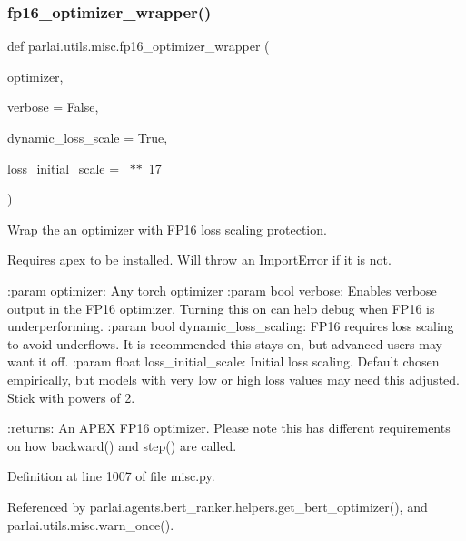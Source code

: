 \subsubsection{\texorpdfstring{fp16\+\_\+optimizer\+\_\+wrapper()}{fp16\_optimizer\_wrapper()}}
{\footnotesize\ttfamily def parlai.\+utils.\+misc.\+fp16\+\_\+optimizer\+\_\+wrapper (\begin{DoxyParamCaption}\item[{}]{optimizer,  }\item[{}]{verbose = {\ttfamily False},  }\item[{}]{dynamic\+\_\+loss\+\_\+scale = {\ttfamily True},  }\item[{}]{loss\+\_\+initial\+\_\+scale = {~$\ast$$\ast$~17} }\end{DoxyParamCaption})}

\begin{DoxyVerb}Wrap the an optimizer with FP16 loss scaling protection.

Requires apex to be installed. Will throw an ImportError if it is not.

:param optimizer:
    Any torch optimizer
:param bool verbose:
    Enables verbose output in the FP16 optimizer. Turning this on can help
    debug when FP16 is underperforming.
:param bool dynamic_loss_scaling:
    FP16 requires loss scaling to avoid underflows. It is recommended this
    stays on, but advanced users may want it off.
:param float loss_initial_scale:
    Initial loss scaling. Default chosen empirically, but models with very low
    or high loss values may need this adjusted. Stick with powers of 2.

:returns:
    An APEX FP16 optimizer. Please note this has different requirements on
    how backward() and step() are called.
\end{DoxyVerb}
 

Definition at line 1007 of file misc.\+py.



Referenced by parlai.\+agents.\+bert\+\_\+ranker.\+helpers.\+get\+\_\+bert\+\_\+optimizer(), and parlai.\+utils.\+misc.\+warn\+\_\+once().

